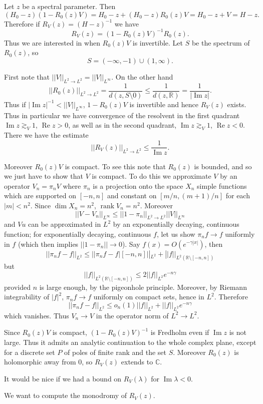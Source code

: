 \documentclass[12pt]{report}
\newcommand{\RR}{\mathbb{R}}
\newcommand{\CC}{\mathbb{C}}
\DeclareMathOperator{\rank}{rank}
\renewcommand{\Re}{\operatorname{Re}}
\renewcommand{\Im}{\operatorname{Im}}
\theoremstyle{definition}
\begin{document}
Let $z$ be a spectral parameter.
Then
$$(H_0 - z)(1 - R_0(z)V) = H_0 - z + (H_0 - z)R_0(z)V = H_0 - z + V = H - z.$$
Therefore if $R_V(z) = (H - z)^{-1}$ we have
$$R_V(z) = (1 - R_0(z)V)^{-1}R_0(z).$$
Thus we are interested in when $R_0(z)V$ is invertible.
Let $S$ be the spectrum of $R_0(z)$, so
$$S = (-\infty, -1) \cup (1, \infty).$$

First note that $||V||_{L^2 \to L^2} = ||V||_{L^\infty}$. On the other hand
$$||R_0(z)||_{L^2 \to L^2} = \frac{1}{d(z, S \setminus 0)} \leq \frac{1}{d(z, \RR)} = \frac{1}{|\Im z|}.$$
Thus if $|\Im z|^{-1} < ||V||_{L^\infty}$, $1 - R_0(z)V$ is invertible and hence $R_V(z)$ exists.
Thus in particular we have convergence of the resolvent in the first quadrant $\Im z \gtrsim_V 1$, $\Re z > 0$, as well as in the second quadrant, $\Im z \gtrsim_V 1$, $\Re z < 0$.
There we have the estimate
$$||R_V(z)||_{L^2 \to L^2} \leq \frac{1}{\Im z}.$$

Moreover $R_0(z)V$ is compact. To see this note that $R_0(z)$ is bounded, and so we just have to show that $V$ is compact.
To do this we approximate $V$ by an operator $V_n = \pi_nV$ where $\pi_n$ is a projection onto the space $X_n$ simple functions which are supported on $[-n, n]$ and constant on $[m/n, (m+1)/n]$ for each $|m| < n^2$.
Since $\dim X_n = n^2$, $\rank V_n = n^2$. Moreover
$$||V - V_n||_{L^\infty} \leq ||1 - \pi_n||_{L^2 \to L^2} ||V||_{L^\infty}$$
and $Vu$ can be approximated in $L^2$ by an exponentially decaying, continuous function; for exponentially decaying, continuous $f$, let us show $\pi_nf \to f$ uniformly in $f$ (which then implies $||1 - \pi_n|| \to 0$).
Say $f(x) = O(e^{-\gamma|x|})$, then
$$||\pi_nf - f||_{L^2} \leq ||\pi_nf - f|[-n, n]||_{L^2} + ||f||_{L^2(\RR \setminus [-n, n])}$$
but
$$||f||_{L^2(\RR \setminus [-n, n])} \leq 2||f||_{L^2}e^{-n\gamma}$$
provided $n$ is large enough, by the pigeonhole principle.
Moreover, by Riemann integrability of $|f|^2$, $\pi_nf \to f$ uniformly on compact sets, hence in $L^2$. Therefore
$$||\pi_nf - f||_{L^2} \leq o_n(1)||f||_{L^2} + ||f||_{L^2}e^{-n\gamma}$$
which vanishes. Thus $V_n \to V$ in the operator norm of $L^2 \to L^2$.

Since $R_0(z)V$ is compact, $(1 - R_0(z)V)^{-1}$ is Fredholm even if $\Im z$ is not large.
Thus it admits an analytic continuation to the whole complex plane, except for a discrete set $P$ of poles of finite rank and the set $S$.
Moreover $R_0(z)$ is holomorphic away from $0$, so $R_V(z)$ extends to $\CC$.

It would be nice if we had a bound on $R_V(\lambda)$ for $\Im \lambda < 0$.

We want to compute the monodromy of $R_V(z)$.


\newpage
\printindex
\end{document}
